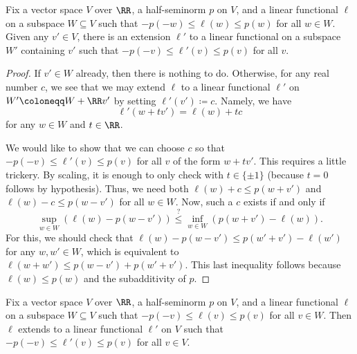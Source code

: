 \documentclass[notes.tex]{subfiles}
\begin{document}
\begin{lemma} \label{lem:hahn-banach-one-step}
	Fix a vector space $V$ over $\RR$, a half-seminorm $p$ on $V$, and a linear functional $\ell$ on a subspace $W\subseteq V$ such that $-p(-w)\le\ell(w)\le p(w)$ for all $w\in W$. Given any $v'\in V$, there is an extension $\ell'$ to a linear functional on a subspace $W'$ containing $v'$ such that $-p(-v)\le\ell'(v)\le p(v)$ for all $v$.
\end{lemma}
\begin{proof}
	If $v'\in W$ already, then there is nothing to do. Otherwise, for any real number $c$, we see that we may extend $\ell$ to a linear functional $\ell'$ on $W'\coloneqq W+\RR v'$ by setting $\ell'(v')\coloneqq c$. Namely, we have
	\[\ell'(w+tv')=\ell(w)+tc\]
	for any $w\in W$ and $t\in\RR$.
	
	We would like to show that we can choose $c$ so that $-p(-v)\le\ell'(v)\le p(v)$ for all $v$ of the form $w+tv'$. This requires a little trickery. By scaling, it is enough to only check with $t\in\{\pm1\}$ (because $t=0$ follows by hypothesis). Thus, we need both $\ell(w)+c\le p(w+v')$ and $\ell(w)-c\le p(w-v')$ for all $w\in W$. Now, such a $c$ exists if and only if
	\[\sup_{w\in W}(\ell(w)-p(w-v'))\stackrel?\le\inf_{w\in W}(p(w+v')-\ell(w)).\]
	For this, we should check that $\ell(w)-p(w-v')\le p(w'+v')-\ell(w')$ for any $w,w'\in W$, which is equivalent to $\ell(w+w')\le p(w-v')+p(w'+v')$. This last inequality follows because $\ell(w)\le p(w)$ and the subadditivity of $p$.
\end{proof}
\begin{proposition} \label{prop:hahn-banach-real}
	Fix a vector space $V$ over $\RR$, a half-seminorm $p$ on $V$, and a linear functional $\ell$ on a subspace $W\subseteq V$ such that $-p(-v)\le\ell(v)\le p(v)$ for all $v\in W$. Then $\ell$ extends to a linear functional $\ell'$ on $V$ such that $-p(-v)\le \ell'(v)\le p(v)$ for all $v\in V$.
\end{proposition}
\end{document}
